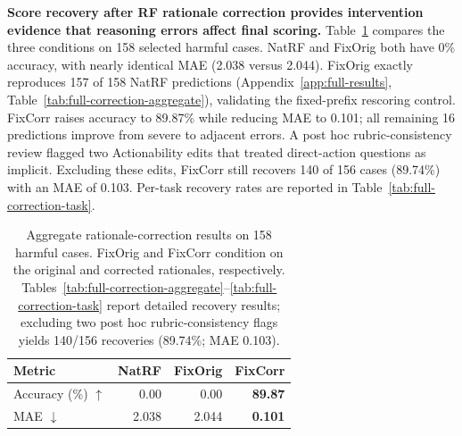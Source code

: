 
\textbf{Score recovery after RF rationale correction provides
intervention evidence that reasoning errors affect final scoring.}
Table~\ref{tab:rationale-correction} compares the three conditions on 158
selected harmful cases.
NatRF and FixOrig both have 0\% accuracy,
with nearly identical MAE (2.038 versus 2.044).
FixOrig exactly reproduces 157 of 158 NatRF predictions
(Appendix~\ref{app:full-results},
Table~\ref{tab:full-correction-aggregate}),
validating the fixed-prefix rescoring control.
FixCorr raises accuracy to 89.87\%
while reducing MAE to 0.101; all remaining 16 predictions improve
from severe to adjacent errors. A post hoc rubric-consistency review flagged
two Actionability edits that treated direct-action questions as implicit.
Excluding these edits, FixCorr still recovers 140 of 156 cases (89.74\%)
with an MAE of 0.103. Per-task recovery rates are reported in
Table~\ref{tab:full-correction-task}.

\begin{table}[H]
\centering
\small
\setlength{\tabcolsep}{5pt}
\begin{tabular*}{\columnwidth}{@{\extracolsep{\fill}}lrrr@{}}
\toprule
Metric & NatRF & FixOrig & FixCorr \\
\midrule
Accuracy (\%) $\uparrow$ & 0.00 & 0.00 & \textbf{89.87} \\
MAE $\downarrow$ & 2.038 & 2.044 & \textbf{0.101} \\
\bottomrule
\end{tabular*}
\caption{Aggregate rationale-correction results on 158 harmful cases.
FixOrig and FixCorr condition on the original and corrected rationales,
respectively. Tables~\ref{tab:full-correction-aggregate}--\ref{tab:full-correction-task}
report detailed recovery results; excluding two post hoc rubric-consistency
flags yields 140/156 recoveries (89.74\%; MAE 0.103).}
\label{tab:rationale-correction}
\end{table}

